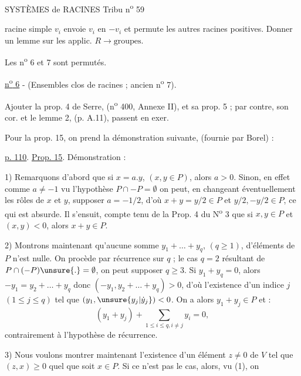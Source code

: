 SYSTÈMES de RACINES \hfill Tribu n\textsuperscript{o} 59

racine simple $v_i$ envoie $v_i$ en $-v_i$ et permute les autres racines positives. Donner un lemme sur les applic. $R\longrightarrow\text{groupes}$.

Les n\textsuperscript{o} 6 et 7 sont permutés.

\uline{n\textsuperscript{o} 6} - (Ensembles clos de racines ; ancien n\textsuperscript{o} 7).

Ajouter la prop. 4 de Serre, (n\textsuperscript{o} 400, Annexe II), et sa prop. 5 ; par contre, son cor. et le lemme 2, (p. A.11), passent en exer.

Pour la prop. 15, on prend la démonstration suivante, (fournie par Borel) :

\uline{p. 110}. \uline{Prop. 15}. Démonstration :

1) Remarquons d'abord que si $x=a.y$, $(x,y\in P)$, alors $a>0$. Sinon, en effet comme $a\neq-1$ vu l'hypothèse $P\cap-P=\emptyset$ on peut, en changeant éventuellement les rôles de $x$ et $y$, supposer $a=-1/2$, d'où $x+y=y/2\in P$ et $y/2,-y/2\in P$, ce qui est absurde. Il s'ensuit, compte tenu de la Prop. 4 du N\textsuperscript{o} 3 que si $x,y\in P$ et $(x,y)<0$, alors $x+y\in P$.

2) Montrons maintenant qu'aucune somme $y_1+\ldots+y_q$, $(q\geq 1)$, d'éléments de $P$ n'est nulle. On procède par récurrence sur $q$ ; le cas $q=2$ résultant de $P\cap(-P)\unsure{.}=\emptyset$, on peut supposer $q\geq 3$. Si $y_1+y_q=0$, alors $-y_1=y_2+\ldots+y_q$ donc $(-y_1,y_2+\ldots+y_q)>0$, d'où l'existence d'un indice $j$ $(1\leq j\leq q)$ tel que $(y_1,\unsure{y_j|\dot y_j})<0$. On a alors $y_1+y_j\in P$ et :
\[
 (y_1+y_j)+\textstyle\sum_{1\leq i\leq q,i\neq j}y_i=0,
\]
contrairement à l'hypothèse de récurrence.

3) Nous voulons montrer maintenant l'existence d'un élément $z\neq 0$ de $V$ tel que $(z,x)\geq 0$ quel que soit $x\in P$. Si ce n'est pas le cas, alors, vu (1), on

